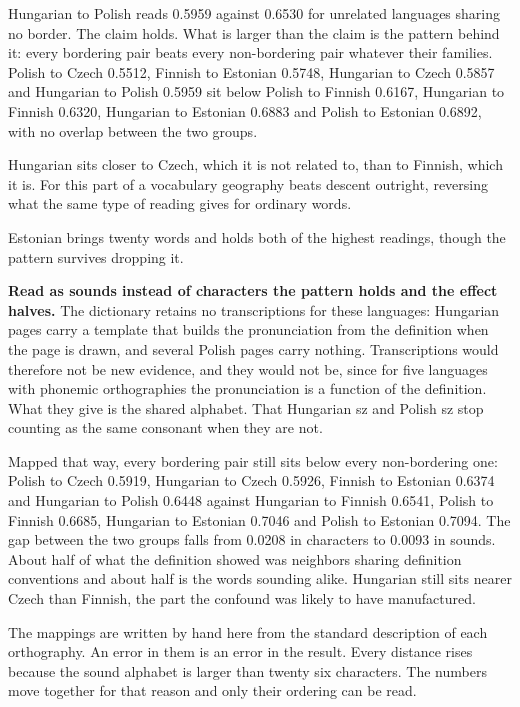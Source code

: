 Hungarian to Polish reads 0.5959 against 0.6530 for unrelated languages sharing no border. The claim holds. What is larger than the claim is the pattern behind it: every bordering pair beats every non-bordering pair whatever their families. Polish to Czech 0.5512, Finnish to Estonian 0.5748, Hungarian to Czech 0.5857 and Hungarian to Polish 0.5959 sit below Polish to Finnish 0.6167, Hungarian to Finnish 0.6320, Hungarian to Estonian 0.6883 and Polish to Estonian 0.6892, with no overlap between the two groups.

Hungarian sits closer to Czech, which it is not related to, than to Finnish, which it is. For this part of a vocabulary geography beats descent outright, reversing what the same type of reading gives for ordinary words.

Estonian brings twenty words and holds both of the highest readings, though the pattern survives dropping it.

\textbf{Read as sounds instead of characters the pattern holds and the effect halves.} The dictionary retains no transcriptions for these languages: Hungarian pages carry a template that builds the pronunciation from the definition when the page is drawn, and several Polish pages carry nothing. Transcriptions would therefore not be new evidence, and they would not be, since for five languages with phonemic orthographies the pronunciation is a function of the definition. What they give is the shared alphabet. That Hungarian sz and Polish sz stop counting as the same consonant when they are not.

Mapped that way, every bordering pair still sits below every non-bordering one: Polish to Czech 0.5919, Hungarian to Czech 0.5926, Finnish to Estonian 0.6374 and Hungarian to Polish 0.6448 against Hungarian to Finnish 0.6541, Polish to Finnish 0.6685, Hungarian to Estonian 0.7046 and Polish to Estonian 0.7094. The gap between the two groups falls from 0.0208 in characters to 0.0093 in sounds. About half of what the definition showed was neighbors sharing definition conventions and about half is the words sounding alike. Hungarian still sits nearer Czech than Finnish, the part the confound was likely to have manufactured.

The mappings are written by hand here from the standard description of each orthography. An error in them is an error in the result. Every distance rises because the sound alphabet is larger than twenty six characters. The numbers move together for that reason and only their ordering can be read.

